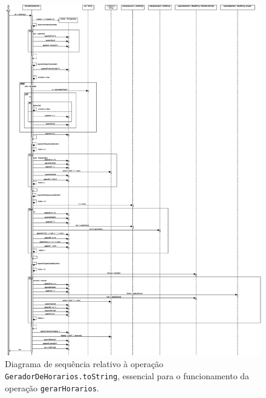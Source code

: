 \documentclass[12pt, a4paper]{article}
\begin{document}
\begin{figure}[H]
    \centering
    \includegraphics[scale=0.32]{Imagens/Modelos/gerarHorariosToStringDAO.svg.eps}
    \caption{
        Diagrama de sequência relativo à operação \texttt{GeradorDeHorarios.toString},
        essencial para o funcionamento da operação \texttt{gerarHorarios}.
    }
\end{figure}
\end{document}
